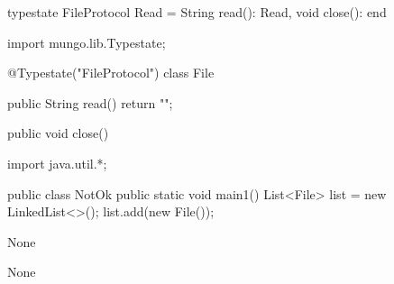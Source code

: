 \begin{code}
typestate FileProtocol {
  Read = {
    String read(): Read,
    void close(): end
  }
}\end{code}

\begin{code}
import mungo.lib.Typestate;

@Typestate("FileProtocol")
class File {

  public String read() {
    return "";
  }

  public void close() {
  }

}\end{code}

\begin{code}
import java.util.*;

public class NotOk {
  public static void main1() {
    List<File> list = new LinkedList<>();
    list.add(new File());
  }
}\end{code}

\lstset{caption=Original Mungo output}
\begin{code}
None
\end{code}

\lstset{caption=New Mungo output}
\begin{code}
None
\end{code}

